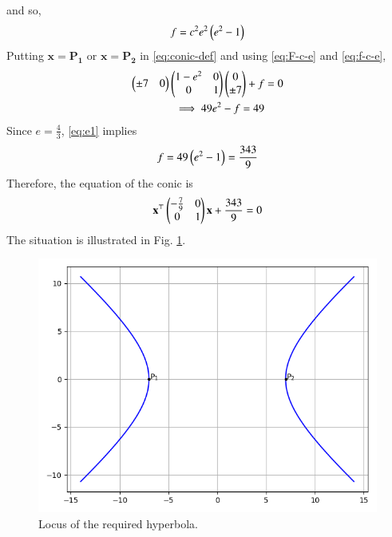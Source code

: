 \documentclass[journal,12pt,twocolumn]{IEEEtran}
\renewcommand{\vec}[1]{\boldsymbol{\mathbf{#1}}}
\begin{document}
\begin{enumerate}
\begin{align}
        \label{eq:F-c-e}
    \end{align}
    and so,
    \begin{align}
        f = c^2e^2\left(e^2-1\right)
        \label{eq:f-c-e}
    \end{align}
    Putting $\vec{x} = \vec{P_1}$ or $\vec{x} = \vec{P_2}$ in \eqref{eq:conic-def} 
    and using \eqref{eq:F-c-e} and \eqref{eq:f-c-e},
    \begin{align}
        \begin{pmatrix}\pm7&0\end{pmatrix}\begin{pmatrix}1-e^2&0\\0&1\end{pmatrix}\begin{pmatrix}0\\\pm7\end{pmatrix} + f &= 0 \\
        \implies 49e^2 - f = 49 \label{eq:e1}
    \end{align}
    Since $e = \frac{4}{3}$, \eqref{eq:e1} implies
    \begin{align}
        f = 49\left(e^2-1\right) = \frac{343}{9}
    \end{align}
    Therefore, the equation of the conic is
    \begin{align}
        \vec{x}^\top\myvec{-\frac{7}{9}&0\\0&1}\vec{x} + \frac{343}{9} = 0
    \end{align}
    The situation is illustrated in Fig. \ref{fig:hyperbola}.
    \begin{figure}[!ht]
        \centering
        \includegraphics[width=\columnwidth]{figs/hyperbola.png}
        \caption{Locus of the required hyperbola.}
        \label{fig:hyperbola}
    \end{figure}
\end{enumerate}
\end{document}
